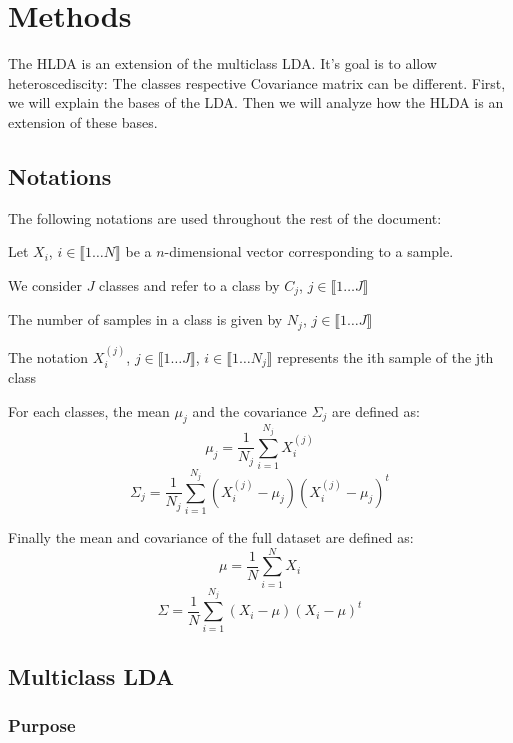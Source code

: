 
\section{Methods}
\label{sec:definitions}

The HLDA is an extension of the multiclass LDA.
It's goal is to allow heteroscediscity: The classes respective Covariance matrix can be different.
First, we will explain the bases of the LDA.
Then we will analyze how the HLDA is an extension of these bases.

\subsection{Notations}

The following notations are used throughout the rest of the document:

\begin{itemize*}
  \item Let $X_i$, $i \in \llbracket 1 \ldots N \rrbracket$ be a $n$-dimensional vector corresponding to a sample.
  \item We consider $J$ classes and refer to a class by $C_j$, $j \in \llbracket 1 \ldots J \rrbracket$
  \item The number of samples in a class is given by $N_j$, $j \in \llbracket 1 \ldots J \rrbracket$
  \item The notation $X_i^{(j)}$, $j \in \llbracket 1 \ldots J \rrbracket$, $i \in \llbracket 1 \ldots N_j \rrbracket$
    represents the ith sample of the jth class
  \item For each classes, the mean $\mu_j$ and the covariance $\Sigma_j$ are defined as:
    $$\mu_j = \frac{1}{N_j}\sum\limits_{i = 1}^{N_j} X_i^{(j)}$$
    $$\Sigma_j = \frac{1}{N_j}\sum\limits_{i = 1}^{N_j} (X_i^{(j)} - \mu_j)(X_i^{(j)} - \mu_j)^t$$
  \item Finally the mean and covariance of the full dataset are defined as:
    $$\mu = \frac{1}{N}\sum\limits_{i = 1}^{N} X_i$$
    $$\Sigma = \frac{1}{N}\sum\limits_{i = 1}^{N_j} (X_i - \mu)(X_i - \mu)^t$$
\end{itemize*}

\subsection{Multiclass LDA}

\subsubsection{Purpose}

